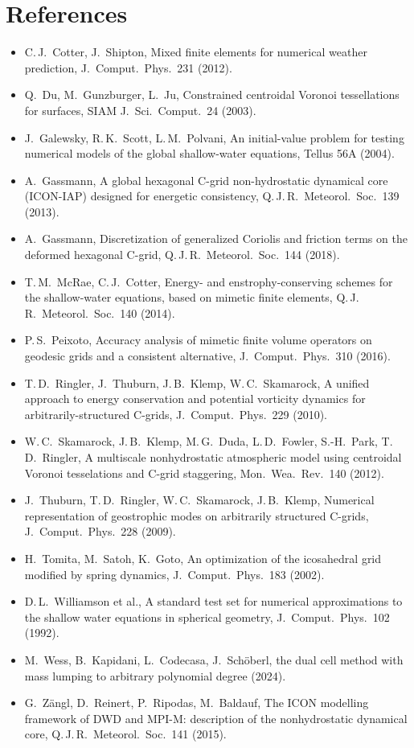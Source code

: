 \documentclass[11pt,a4paper]{article}
\begin{document}
\section*{References}
\begin{itemize}\setlength\itemsep{0pt}
\item C.\,J.~Cotter, J.~Shipton, Mixed finite elements for numerical weather prediction, J.~Comput.\ Phys.\ 231 (2012).
\item Q.~Du, M.~Gunzburger, L.~Ju, Constrained centroidal Voronoi tessellations for surfaces, SIAM J.\ Sci.\ Comput.\ 24 (2003).
\item J.~Galewsky, R.\,K.~Scott, L.\,M.~Polvani, An initial-value problem for testing numerical models of the global shallow-water equations, Tellus 56A (2004).
\item A.~Gassmann, A global hexagonal C-grid non-hydrostatic dynamical core (ICON-IAP) designed for energetic consistency, Q.\,J.\,R.\ Meteorol.\ Soc.\ 139 (2013).
\item A.~Gassmann, Discretization of generalized Coriolis and friction terms on the deformed hexagonal C-grid, Q.\,J.\,R.\ Meteorol.\ Soc.\ 144 (2018).
\item T.\,M.~McRae, C.\,J.~Cotter, Energy- and enstrophy-conserving schemes for the shallow-water equations, based on mimetic finite elements, Q.\,J.\,R.\ Meteorol.\ Soc.\ 140 (2014).
\item P.\,S.~Peixoto, Accuracy analysis of mimetic finite volume operators on geodesic grids and a consistent alternative, J.~Comput.\ Phys.\ 310 (2016).
\item T.\,D.~Ringler, J.~Thuburn, J.\,B.~Klemp, W.\,C.~Skamarock, A unified approach to energy conservation and potential vorticity dynamics for arbitrarily-structured C-grids, J.~Comput.\ Phys.\ 229 (2010).
\item W.\,C.~Skamarock, J.\,B.~Klemp, M.\,G.~Duda, L.\,D.~Fowler, S.-H.~Park, T.\,D.~Ringler, A multiscale nonhydrostatic atmospheric model using centroidal Voronoi tesselations and C-grid staggering, Mon.\ Wea.\ Rev.\ 140 (2012).
\item J.~Thuburn, T.\,D.~Ringler, W.\,C.~Skamarock, J.\,B.~Klemp, Numerical representation of geostrophic modes on arbitrarily structured C-grids, J.~Comput.\ Phys.\ 228 (2009).
\item H.~Tomita, M.~Satoh, K.~Goto, An optimization of the icosahedral grid modified by spring dynamics, J.~Comput.\ Phys.\ 183 (2002).
\item D.\,L.~Williamson et al., A standard test set for numerical approximations to the shallow water equations in spherical geometry, J.~Comput.\ Phys.\ 102 (1992).
\item M.~Wess, B.~Kapidani, L.~Codecasa, J.~Sch\"oberl, the dual cell method with mass lumping to arbitrary polynomial degree (2024).
\item G.~Z\"angl, D.~Reinert, P.~Ripodas, M.~Baldauf, The ICON modelling framework of DWD and MPI-M: description of the nonhydrostatic dynamical core, Q.\,J.\,R.\ Meteorol.\ Soc.\ 141 (2015).
\end{itemize}
\end{document}
